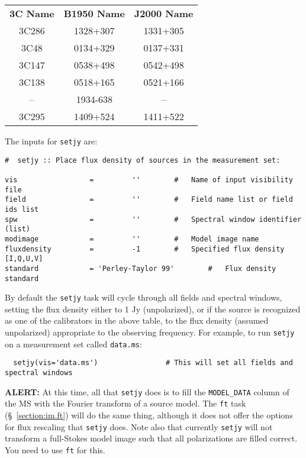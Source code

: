 \vspace{5mm}
\begin{table}[h!]
\caption[Recognized Flux Density Calibrators.]
        {\label{table:fluxcal-table}}
\begin{center}
\begin{tabular}{|ccc|} \hline
{\bf 3C Name}  & {\bf B1950 Name}& {\bf J2000 Name} \\
  3C286        &  1328+307       &  1331+305        \\
  3C48         &  0134+329       &  0137+331        \\
  3C147        &  0538+498       &  0542+498        \\
  3C138        &  0518+165       &  0521+166        \\
  --           &  1934-638       &    --            \\
  3C295        &  1409+524       &  1411+522        \\
\hline
\end{tabular}
\end{center}
\end{table}

The inputs for {\tt setjy} are:
\small
\begin{verbatim}
#  setjy :: Place flux density of sources in the measurement set:

vis                 =         ''        #   Name of input visibility file
field               =         ''        #   Field name list or field ids list
spw                 =         ''        #   Spectral window identifier (list)
modimage            =         ''        #   Model image name
fluxdensity         =         -1        #   Specified flux density [I,Q,U,V]
standard            = 'Perley-Taylor 99'        #   Flux density standard
\end{verbatim}
\normalsize
By default the {\tt setjy} task will cycle through all fields and
spectral windows, setting the flux density either to 1 Jy
(unpolarized), or if the source is recognized as one of the
calibrators in the above table, to the flux density (assumed
unpolarized) appropriate to the observing frequency.  For example,
to run {\tt setjy} on a measurement set called {\tt data.ms}:
\small
\begin{verbatim}
  setjy(vis='data.ms')                # This will set all fields and spectral windows
\end{verbatim}
\normalsize

{\bf ALERT:} At this time, all that {\tt setjy} does is to fill
the {\tt MODEL\_DATA} column of the MS with the Fourier transform of
a source model.  The {\tt ft} task (\S~\ref{section:im.ft})
will do the same thing, although it does not offer the options for
flux rescaling that {\tt setjy} does.  Note also that currently 
{\tt setjy} will not transform a full-Stokes model image such that all
polarizations are filled correct.  You need to use {\tt ft} for this.

